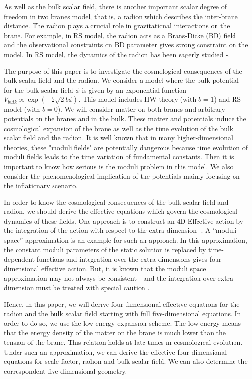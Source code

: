 \documentclass[a4paper,11pt]{article}
\begin{document}
As well as the bulk scalar field, there is another important 
scalar degree of freedom in two branes model, that is,  a radion 
which describes the inter-brane distance. The radion plays a 
crucial role in gravitational interactions on the brane. 
For example, in RS model, the radion acts as a Brans-Dicke (BD) field
and the observational constraints on BD parameter gives strong constraint
on the model. In RS model, the dynamics of the radion has been eagerly 
studied \cite{CG}-\cite{K}. 

The purpose of this paper is to investigate the cosmological consequences 
of the bulk scalar field and the radion. We consider a model where the 
bulk potential for the bulk scalar field $\phi$ is given by an exponential 
function $V_{bulk} \propto \exp (-2 \sqrt{2} b \phi)$. This model includes  
HW theory (with $b=1$) and RS model (with $b=0$). We will consider matter on both 
branes and arbitrary potentials on the branes and in the bulk. These matter and 
potentials induce the cosmological expansion of the brane as well as the 
time evolution of the bulk scalar field and the radion. It is well known that 
in many higher-dimensional theories, these "moduli fields" are potentially
dangerous because time evolution of moduli fields leads to the time variation
of fundamental constants. Then it is important to know how serious is the 
moduli problem in this model. We also consider the phenomenological 
implication of the potentials mainly focusing on the inflationary scenario.

In order to know the cosmological consequences of the 
bulk scalar field and radion, we should derive the effective
equations which govern the cosmological dynamics of these  
fields. One approach is to construct an 
4D Effective action by the integration of the action with respect to 
the extra dimension \cite{chiba}-\cite{BBDR1}.  
A ``moduli space'' approximation is an example for such an approach.
In this approximation,  the constant moduli parameters 
of the static solution is replaced by time-dependent functions and integration 
over the extra dimensions gives four-dimensional effective action. 
But, it is known that the moduli space
approximation may not always be consistent \cite{KKLT}-\cite{T}
and the integration over extra-dimension must be treated with special caution 
\cite{Mukohyama}.

Hence, in this paper, we will derive four-dimensional effective 
equations for the radion and the bulk scalar field starting with full 
five-dimensional equations. In order to do so, we use the low-energy expansion 
scheme. The low-energy means that the energy density of the matter 
on the brane 
is much lower than the tension of the brane. This relation holds 
at late times in cosmological evolution. Under such an approximation, 
we can derive the effective four-dimensional equations for 
scale factor, radion and bulk scalar field. We can also determine
the correspondent five-dimensional geometry.
\end{document}
